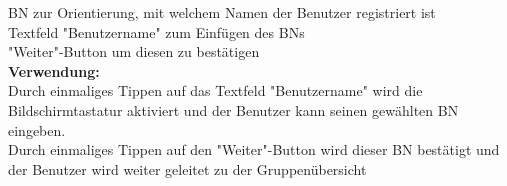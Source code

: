 BN zur Orientierung, mit welchem Namen der Benutzer registriert ist\\
Textfeld "Benutzername" zum Einfügen des BNs\\
"Weiter"-Button um diesen zu bestätigen\\
\textbf{Verwendung:}\\
Durch einmaliges Tippen auf das Textfeld "Benutzername" wird die Bildschirmtastatur aktiviert und der Benutzer kann seinen gewählten BN eingeben.\\
Durch einmaliges Tippen auf den "Weiter"-Button wird dieser BN bestätigt und der Benutzer wird weiter geleitet zu der Gruppenübersicht\\ \\